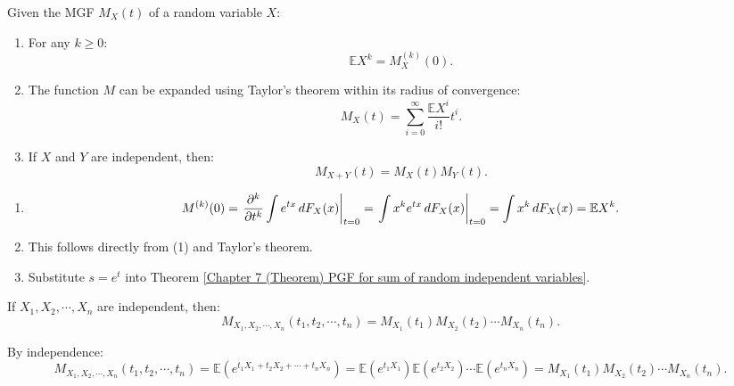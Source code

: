 \documentclass{huhtakm-template-book-v2}
\newcommand{\expect}{\mathbb{E}}
\begin{document}
    \begin{lem}
        Given the MGF $M_{X}(t)$ of a random variable $X$:
        \begin{enumerate}
            \item For any $k \geq 0$:
            \begin{equation*}
                \expect{X^{k}} = M_{X}^{(k)}(0).
            \end{equation*}
            \item The function $M$ can be expanded using Taylor's theorem within its radius of convergence:
            \begin{equation*}
                M_{X}(t) = \sum_{i = 0}^{\infty}\frac{\expect{X^{i}}}{i!}t^{i}.
            \end{equation*}
            \item If $X$ and $Y$ are independent, then:
            \begin{equation*}
                M_{X+Y}(t) = M_{X}(t)M_{Y}(t).
            \end{equation*}
        \end{enumerate}
    \end{lem}
    \begin{proofing}
        \begin{enumerate}
            \item 
            \begin{equation*}
                M^{(k)}(0) = \left.\pdv*[order = {k}]{\int e^{tx}\,dF_{X}(x)}{t}\right|_{t = 0} = \left.\int x^{k}e^{tx}\,dF_{X}(x)\right|_{t = 0} = \int x^{k}\,dF_{X}(x) = \expect{X^{k}}.
            \end{equation*}
            \item This follows directly from (1) and Taylor's theorem.
            \item Substitute $s = e^{t}$ into Theorem \ref{Chapter 7 (Theorem) PGF for sum of random independent variables}.
        \end{enumerate}
    \end{proofing}
    \begin{lem}
        If $X_{1},X_{2},\cdots,X_{n}$ are independent, then:
        \begin{equation*}
            M_{X_{1},X_{2},\cdots,X_{n}}(t_{1},t_{2},\cdots,t_{n}) = M_{X_{1}}(t_{1})M_{X_{2}}(t_{2})\cdots M_{X_{n}}(t_{n}).
        \end{equation*}
    \end{lem}
    \begin{proofing}
        By independence:
        \begin{equation*}
            M_{X_{1},X_{2},\cdots,X_{n}}(t_{1},t_{2},\cdots,t_{n}) = \expect(e^{t_{1}X_{1}+t_{2}X_{2}+\cdots+t_{n}X_{n}}) = \expect(e^{t_{1}X_{1}})\expect(e^{t_{2}X_{2}})\cdots\expect(e^{t_{n}X_{n}}) = M_{X_{1}}(t_{1})M_{X_{2}}(t_{2})\cdots M_{X_{n}}(t_{n}).
        \end{equation*}
    \end{proofing}
    \newpage
    
\end{document}
